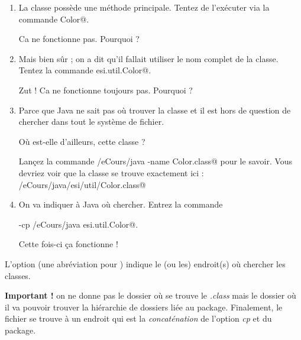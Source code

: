 \documentclass[11pt,a4paper]{article}
\begin{document}
					\begin{enumerate}
				
			\item 
				La classe poss\`ede une m\'ethode principale.
				Tentez de l'ex\'ecuter via la commande
				\verb@java Color@.
				\par
				
				Ca ne fonctionne pas. Pourquoi ?
			
			\item 
				Mais bien s\^ur ; on a dit qu'il fallait utiliser
				le nom complet de la classe.
				Tentez la commande
				\verb@java esi.util.Color@.
				\par
				
				Zut ! Ca ne fonctionne toujours pas. Pourquoi ?
			
			\item 
					Parce que Java ne sait pas o\`u trouver la classe
					et il est hors de question de chercher dans
					tout le syst\`eme de fichier.
				
            \par
        
					O\`u est-elle d'ailleurs, cette classe ?
				
            \par
        
					Lan\c cez la commande
					\verb@find /eCours/java -name Color.class@
					pour le savoir.
					Vous devriez voir que la classe se trouve exactement ici :
					\verb@/eCours/java/esi/util/Color.class@
            \par
        
			\item 
				On va indiquer \`a Java o\`u chercher.
				Entrez la commande
				\par
				\verb@java -cp /eCours/java esi.util.Color@.
				\par
				
				Cette fois-ci \c ca fonctionne !
			
					\end{enumerate}
				
			L'option \verb@cp@
			(une abr\'eviation pour \verb@classpath@)
			indique le (ou les) endroit(s) o\`u chercher les classes.
		
            \par
        \textbf{Important ! }
			on ne donne pas le dossier o\`u se trouve le
			\textit{.class}
			mais le dossier o\`u il va pouvoir trouver
			la hi\'erarchie de dossiers li\'ee au package.
			Finalement, le fichier se trouve \`a un endroit
			qui est la \textit{concat\'enation}
			de l'option \textit{cp}
			et du package.
		
\end{document}
